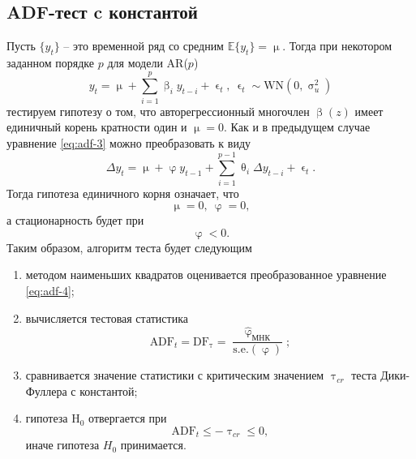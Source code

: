 \documentclass[a4paper, 14pt]{extreport}
\numberwithin{equation}{section}
\renewcommand{\leq}{\leqslant}
\renewcommand{\beta}{\upbeta}
\renewcommand{\epsilon}{\upvarepsilon}
\renewcommand{\theta}{\uptheta}
\renewcommand{\mu}{\upmu}
\renewcommand{\sigma}{\upsigma}
\renewcommand{\tau}{\uptau}
\renewcommand{\varphi}{\upvarphi}
\newcommand{\E}{\mathbb E}
\numberwithin{equation}{section}
\begin{document}
	\subsection{ADF-тест c константой}
	Пусть $\{y_t\}$ -- это временной ряд со средним $\E \{y_t\} = \mu$. Тогда
	при некотором заданном порядке $p$ для модели AR($p$)
	\begin{equation}\label{eq:adf-3}
		y_t=\mu+\sum_{i=1}^{p}\beta_i y_{t-i} + \epsilon_t,\ \epsilon_t\sim \text{WN}(0,\sigma^2_u)
	\end{equation}
	тестируем гипотезу о том, что авторегрессионный многочлен $\beta(z)$ имеет единичный корень кратности один и $\mu=0$.
	Как и в предыдущем случае уравнение \eqref{eq:adf-3} можно преобразовать к виду
	\begin{equation}\label{eq:adf-4}
		\Delta y_t=\mu+\varphi y_{t-1}+\sum_{i=1}^{p-1}\theta_i\Delta y_{t-i}+\epsilon_t.
	\end{equation}
	Тогда гипотеза единичного корня означает, что $$\mu=0,\ \varphi=0,$$ а стационарность будет при $$\varphi<0.$$
	Таким образом, алгоритм теста будет следующим
	\begin{enumerate}
		\item методом наименьших квадратов оценивается преобразованное уравнение \eqref{eq:adf-4};
		\item вычисляется тестовая статистика
		\begin{equation}
			\text{ADF}_t=\text{DF}_\tau=\dfrac{\widehat{\varphi}_{\text{МНК}}}{\text{s.e.}(\varphi)};
		\end{equation}
		\item сравнивается значение статистики с критическим значением $\tau_{cr}$ теста Дики-Фуллера с константой;
		\item гипотеза $\text{H}_0$ отвергается при
		\begin{equation}
			\text{ADF}_t\leq -\tau_{cr}\leq 0,
		\end{equation}
		иначе гипотеза $H_0$ принимается.
	\end{enumerate}
\end{document}
